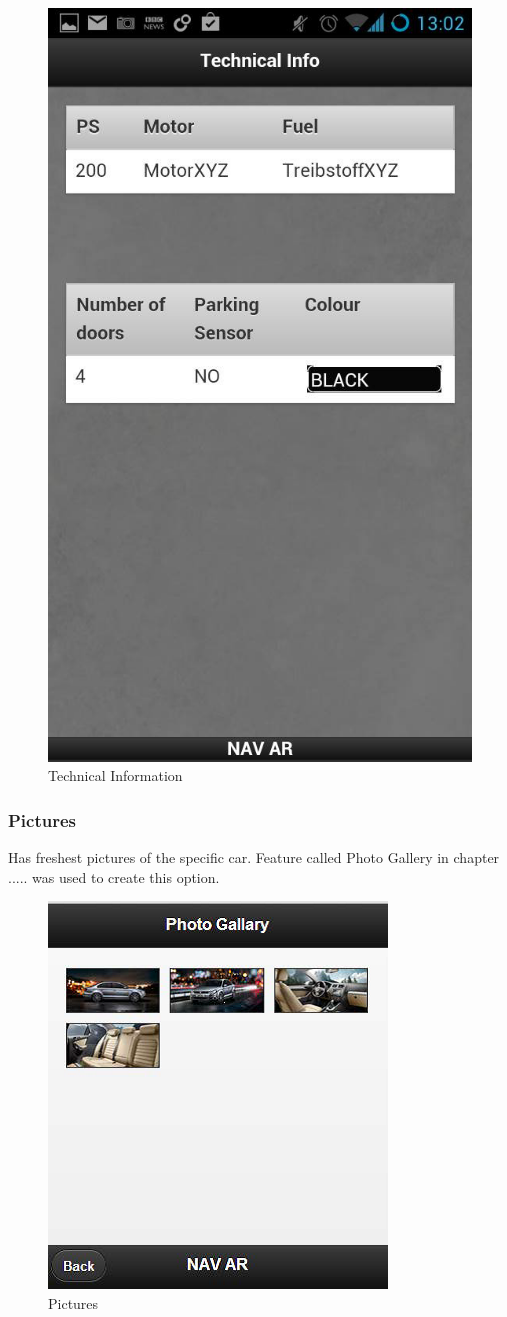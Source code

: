 \begin{figure}[h]
\centering
\includegraphics[width=0.5\linewidth]{graphics/chapter4/6}
\caption{Technical Information}
\end{figure}
\newpage

\subsubsection{Pictures}
Has freshest pictures of the specific car. Feature called Photo Gallery in chapter ..... was used to create this option.

\begin{figure}[h]
\centering
\includegraphics[width=0.5\linewidth]{graphics/chapter4/7}
\caption{Pictures}
\end{figure}
\newpage

